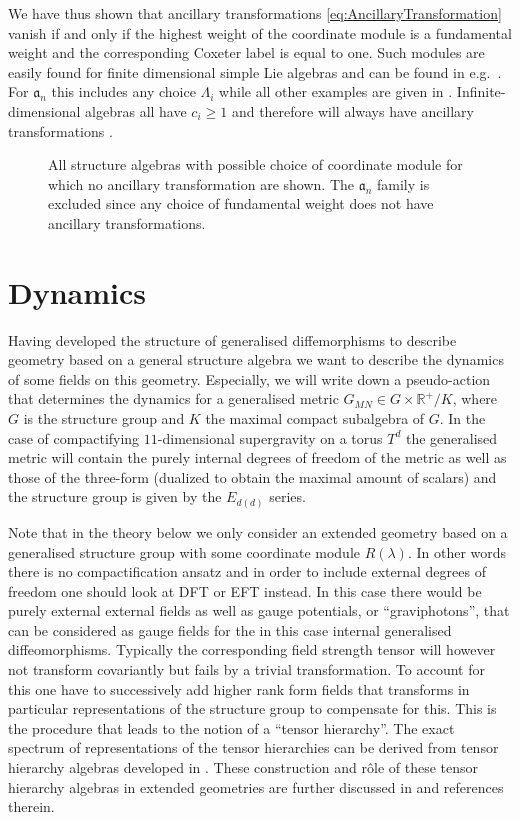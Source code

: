 We have thus shown that ancillary transformations \eqref{eq:AncillaryTransformation} vanish if and only if the highest weight of the coordinate module is a fundamental weight and the corresponding Coxeter label is equal to one. Such modules are easily found for finite dimensional simple Lie algebras and can be found in e.g.\ \cite{Fuchs1997}. For $\mathfrak{a}_n$ this includes any choice $\Lambda_i$ while all other examples are given in . Infinite-dimensional algebras all have $c_i\geq 1$ and therefore will always have ancillary transformations \cite{CederwallPalmkvist2017}. 

\begin{figure}
    \centering
    \DynkinNoAncillary{}
    \caption{All structure algebras with possible choice of coordinate module for which no ancillary transformation are shown. The $\mathfrak{a}_n$ family is excluded since any choice of fundamental weight does not have ancillary transformations.}
    \label{fig:DynkinNoAncillary}
\end{figure}


\section{Dynamics\label{sec:Dynamics}}
Having developed the structure of generalised diffemorphisms to describe geometry based on a general structure algebra we want to describe the dynamics of some fields on this geometry. Especially, we will write down a pseudo-action that determines the dynamics for a generalised metric $G_{MN}\in G\times \mathbb{R}^+/K$, where $G$ is the structure group and $K$ the maximal compact subalgebra of $G$. In the case of compactifying $11$-dimensional supergravity on a torus $T^d$ the generalised metric will contain the purely internal degrees of freedom of the metric as well as those of the three-form (dualized to obtain the maximal amount of scalars) and the structure group is given by the $E_{d(d)}$ series. 

Note that in the theory below we only consider an extended geometry based on a generalised structure group with some coordinate module $R(\lambda)$. In other words there is no compactification ansatz and in order to include external degrees of freedom one should look at DFT or EFT instead. In this case there would be purely external external fields as well as gauge potentials, or ``graviphotons'', that can be considered as gauge fields for the in this case internal generalised diffeomorphisms. Typically the corresponding field strength tensor will however not transform covariantly but fails by a trivial transformation. To account for this one have to successively add higher rank form fields that transforms in particular representations of the structure group to compensate for this. This is the procedure that  leads to the notion of a ``tensor hierarchy''. The exact spectrum of representations of the tensor hierarchies can be derived from tensor hierarchy algebras developed in \cite{Palmkvist:2013vya}. These construction and rôle of these tensor hierarchy algebras in extended geometries are further discussed in  \cite{Cederwall:2018aab,Carbone:2018njd} and references therein.

